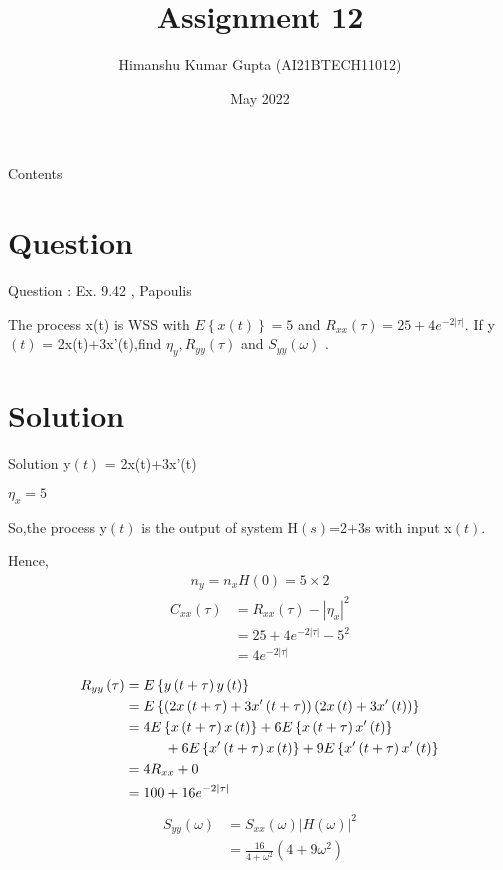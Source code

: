 \documentclass[journal,12pt,twocolumn]{beamer}
\title{Assignment 12}
\author{Himanshu Kumar Gupta (AI21BTECH11012)}
\date {May 2022}
\providecommand{\brak}[1]{\ensuremath{\left(#1\right)}}
\providecommand{\cbrak}[1]{\ensuremath{\left\{#1\right\}}}
\begin{document}
\begin{frame}
 \maketitle   
\end{frame}

\begin{frame}{Contents}
    \tableofcontents
\end{frame}

\section{Question}
\begin{frame}{Question : Ex. 9.42 , Papoulis}
\begin{block}

  The process x(t) is WSS with $E\cbrak{x\brak{t}}=5$ and $R_{xx}\brak{\tau}=25+4e^{-2|\tau|}$. If y\brak{t} = 2x(t)+3x'(t),find $\eta_y,R_{yy}\brak{\tau}$ and $S_{yy}\brak{\omega}$ .
\end{block}
\end{frame}

\section{Solution}
\begin{frame}{Solution}
y\brak{t} = 2x(t)+3x'(t)

$\eta_x=5$

So,the process y\brak{t} is the output of system H\brak{s}=2+3s with input x\brak{t}.

Hence,
\begin{align}
n_y=n_xH(0)=5\times2
\end{align}
\begin{align}
    C_{xx}\brak{\tau}&=R_{xx}\brak{\tau}-|\eta_x|^2    \nonumber\\
    &=25+4e^{-2|\tau|}-5^2\nonumber\\
    &=4e^{-2|\tau|}
\end{align}
\end{frame}
\begin{frame}
    \begin{align}
        R_{yy}\brak{\tau}&=E\cbrak{y\brak{t+\tau}y\brak{t}}\nonumber\\
      &=E\cbrak{\brak{2x\brak{t+\tau}+3x'\brak{t+\tau}}\brak{2x\brak{t}+3x'\brak{t}}}\nonumber\\
      &=4E\cbrak{x\brak{t+\tau}x\brak{t}}+6E\cbrak{x\brak{t+\tau}x'\brak{t}}\nonumber\\&\hspace{10mm}+6E\cbrak{x'\brak{t+\tau}x\brak{t}}+9E\cbrak{x'\brak{t+\tau}x'\brak{t}} \nonumber\\
      &=4R_{xx}+0\nonumber\\
      &=100+16e^{-2|\tau|}
    \end{align}
    \begin{align}
     S_{yy}\brak{\omega}&=S_{xx}\brak{\omega}|H\brak{\omega}|^2\nonumber\\
     &=\frac{16}{4+\omega^2}\brak{4+9\omega^2}
\end{align}
\end{frame}
\end{document}

